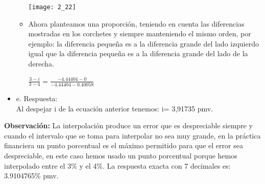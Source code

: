 \begin{itemize}
\begin{itemize}
		\begin{center}
			\texttt{[image: 2\_22]}\\
		\end{center}
		
		\item Ahora planteamos una proporción, teniendo en cuenta las diferencias mostradas en los corchetes y siempre manteniendo el mismo orden, por ejemplo: la diferencia pequeña es a la diferencia grande del lado izquierdo igual que la diferencia pequeña es a la diferencia grande del lado de la derecha.\\
		
		\begin{center}
			$\frac{3-i}{3-4} = \frac{-4.44404 - 0}{-4.44404 - 0.40058}$\\
		\end{center}
		
		
		
	\end{itemize}
	
	\item e. Respuesta:\\
	
	Al despejar i de la ecuación anterior tenemos: i= 3,91735 pmv.\\
	
\end{itemize}

\textbf{Observación:} La interpolación produce un error que es despreciable siempre y cuando el intervalo que se toma para interpolar no sea muy grande, en la práctica financiera un punto porcentual es el máximo permitido para que el error sea despreciable, en este caso hemos usado un punto porcentual porque hemos interpolado entre el 3\% y el 4\%. La respuesta exacta con 7 decimales es: 3.9104765\% pmv.



\cleardoublepage
{}
\setlength{\columnsep}{0.75cm}
\printindex
